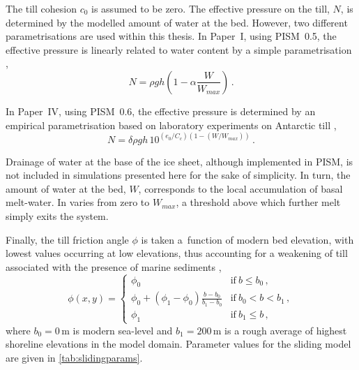 \documentclass{article}
\newcommand{\CCLI}[0]{Paper~I}      %
\newcommand{\CCYC}[0]{Paper~IV}     %
\begin{document}
The till cohesion $c_0$ is assumed to be zero. The effective pressure on the
till, $N$, is determined by the modelled amount of water at the bed. However,
two different parametrisations are used within this thesis. In {\CCLI}, using
PISM~0.5, the effective pressure is linearly related to water content by a
simple parametrisation \citep[Eq.~13]{Winkelmann.etal.2011},
\begin{equation}
    N = \rho gh (1 - \alpha \frac{W}{W_{max}}) \,.
\end{equation}

In {\CCYC}, using PISM~0.6, the effective pressure is determined by an
empirical parametrisation based on laboratory experiments on Antarctic till
\citep{Tulaczyk.etal.2000, Bueler.Pelt.2014},
\begin{equation}
    N = \delta \rho gh \, 10^{(e_0/C_c) (1 - (W/W_{max}))} \,.
\end{equation}

Drainage of water at the base of the ice sheet, although implemented in PISM,
is not included in simulations presented here for the sake of simplicity.
In turn, the amount of water at the bed, $W$, corresponds to the local
accumulation of basal melt-water. In varies from zero to $W_{max}$, a threshold
above which further melt simply exits the system.

Finally, the till friction angle $\phi$ is taken a~function of modern bed
elevation, with lowest values occurring at low elevations, thus accounting for
a weakening of till associated with the presence of marine sediments
\citep[cf.][Eq.~10]{Martin.etal.2011},
\begin{equation}
    \phi(x,y) =
    \begin{cases}
        \phi_0 & \text{if}\ b \le b_0 \,, \\
        \phi_0 + (\phi_1-\phi_0) \frac{b - b_0}{b_1-b_0}
                & \text{if}\ b_0 < b < b_1 \,, \\
        \phi_1 & \text{if}\ b_1 \le b \,,
    \end{cases}
\end{equation}
where $b_0=0$\,m is modern sea-level and $b_1=200$\,m is a rough average of
highest shoreline elevations in the model domain. Parameter values for the
sliding model are given in \cref{tab:slidingparams}.
\end{document}
